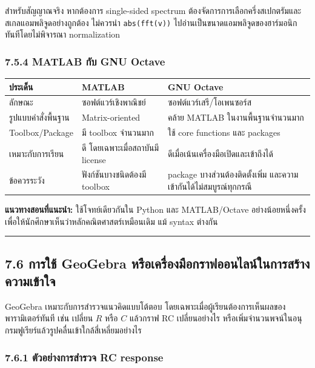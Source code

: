 สำหรับสัญญาณจริง หากต้องการ single-sided spectrum ต้องจัดการการเลือกครึ่งสเปกตรัมและสเกลแอมพลิจูดอย่างถูกต้อง ไม่ควรนำ \texttt{abs(fft(v))} ไปอ่านเป็นขนาดแอมพลิจูดของฮาร์มอนิกทันทีโดยไม่พิจารณา normalization

\subsubsection{7.5.4 MATLAB กับ GNU Octave}

\begin{table}[htbp]
    \centering
    \begin{tabular}{l l l}
        \hline
        \textbf{ประเด็น} & \textbf{MATLAB} & \textbf{GNU Octave} \\
        \hline
        ลักษณะ & ซอฟต์แวร์เชิงพาณิชย์ & ซอฟต์แวร์เสรี/โอเพนซอร์ส \\
        รูปแบบคำสั่งพื้นฐาน & Matrix-oriented & คล้าย MATLAB ในงานพื้นฐานจำนวนมาก \\
        Toolbox/Package & มี toolbox จำนวนมาก & ใช้ core functions และ packages \\
        เหมาะกับการเรียน & ดี โดยเฉพาะเมื่อสถาบันมี license & ดีเมื่อเน้นเครื่องมือเปิดและเข้าถึงได้ \\
        ข้อควรระวัง & ฟังก์ชันบางชนิดต้องมี toolbox & package บางส่วนต้องติดตั้งเพิ่ม และความเข้ากันได้ไม่สมบูรณ์ทุกกรณี \\
        \hline
    \end{tabular}
\end{table}

\textbf{แนวทางสอนที่แนะนำ:} ใช้โจทย์เดียวกันใน Python และ MATLAB/Octave อย่างน้อยหนึ่งครั้ง เพื่อให้นักศึกษาเห็นว่าหลักคณิตศาสตร์เหมือนเดิม แม้ syntax ต่างกัน

\par\noindent\rule{\textwidth}{0.4pt}\par

\subsection{7.6 การใช้ GeoGebra หรือเครื่องมือกราฟออนไลน์ในการสร้างความเข้าใจ}

GeoGebra เหมาะกับการสำรวจแนวคิดแบบโต้ตอบ โดยเฉพาะเมื่อผู้เรียนต้องการเห็นผลของพารามิเตอร์ทันที เช่น เปลี่ยน $R$ หรือ $C$ แล้วกราฟ RC เปลี่ยนอย่างไร หรือเพิ่มจำนวนพจน์ในอนุกรมฟูเรียร์แล้วรูปคลื่นเข้าใกล้สี่เหลี่ยมอย่างไร

\subsubsection{7.6.1 ตัวอย่างการสำรวจ RC response}

